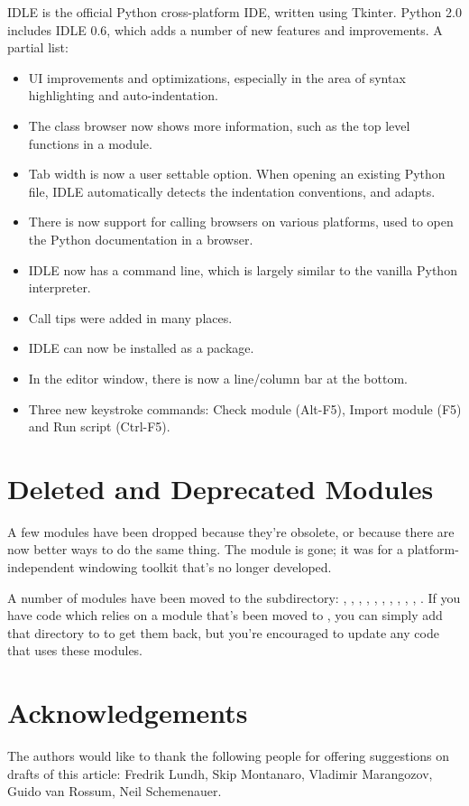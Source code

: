 \documentclass{howto}
\begin{document}
IDLE is the official Python cross-platform IDE, written using Tkinter.
Python 2.0 includes IDLE 0.6, which adds a number of new features and
improvements.  A partial list:

\begin{itemize}
\item  UI improvements and optimizations,
especially in the area of syntax highlighting and auto-indentation.

\item The class browser now shows more information, such as the top
level functions in a module.

\item Tab width is now a user settable option. When opening an existing Python
file, IDLE automatically detects the indentation conventions, and adapts.

\item There is now support for calling browsers on various platforms,
used to open the Python documentation in a browser.

\item IDLE now has a command line, which is largely similar to 
the vanilla Python interpreter.

\item Call tips were added in many places.

\item IDLE can now be installed as a package.

\item In the editor window, there is now a line/column bar at the bottom.

\item Three new keystroke commands: Check module (Alt-F5), Import
module (F5) and Run script (Ctrl-F5).

\end{itemize}

\section{Deleted and Deprecated Modules}

A few modules have been dropped because they're obsolete, or because
there are now better ways to do the same thing.  The 
module is gone; it was for a platform-independent windowing toolkit
that's no longer developed.  

A number of modules have been moved to the
 subdirectory:
, , , , 
, , , 
, , , . 
If you have code which relies on a module  that's been moved to
, you can simply add that directory to   
to get them back, but you're encouraged to update any code that uses
these modules.

\section{Acknowledgements}

The authors would like to thank the following people for offering
suggestions on drafts of this article: Fredrik Lundh, Skip
Montanaro, Vladimir Marangozov, Guido van Rossum, Neil Schemenauer.
\end{document}
